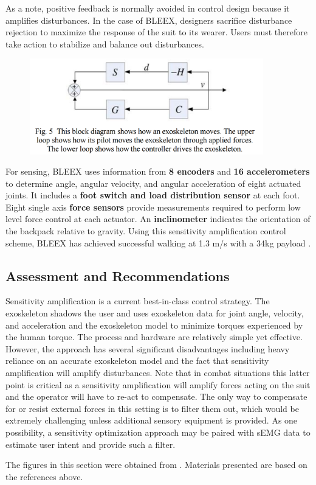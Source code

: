 As a note, positive feedback is normally avoided in control design because it amplifies disturbances.  In the case of BLEEX, designers sacrifice disturbance rejection to maximize the response of the suit to its wearer.  Users must therefore take action to stabilize and balance out disturbances.

\begin{figure}[ht]
  \centering
  \includegraphics[width=4.0in]{exos/figs/bleex_control_diag_3.png}
\end{figure}

For sensing, BLEEX uses information from \textbf{8 encoders} and \textbf{16 accelerometers} to determine angle, angular velocity, and angular acceleration of eight actuated joints. It includes a \textbf{foot switch and load distribution sensor} at each foot. Eight single axis \textbf{force sensors} provide measurements required to perform low level force control at each actuator. An \textbf{inclinometer} indicates the orientation of the backpack relative to gravity. Using this sensitivity amplification control scheme, BLEEX has achieved successful walking at 1.3 m/s with a 34kg payload \cite{sesitivityAmpPaper2005}.

\subsection{Assessment and Recommendations}

Sensitivity amplification is a current best-in-class control strategy.  The exoskeleton shadows the user and uses exoskeleton data for joint angle, velocity, and acceleration and the exoskeleton model to minimize torques experienced by the human torque.  The process and hardware are relatively simple yet effective.   However, the approach has several significant disadvantages including heavy reliance on an accurate exoskeleton model and the fact that sensitivity amplification will amplify disturbances.  Note that in combat situations this latter point is critical as a sensitivity amplification will amplify forces acting on the suit and the operator will have to re-act to compensate.  The only way to compensate for or resist external forces in this setting is to filter them out, which would be extremely challenging unless additional sensory equipment is provided.  As one possibility, a sensitivity optimization approach may be paired with sEMG data to estimate user intent and provide such a filter.





The figures in this section were obtained from \cite{sesitivityAmpPaper2005}. Materials presented are based on the references above.

% 